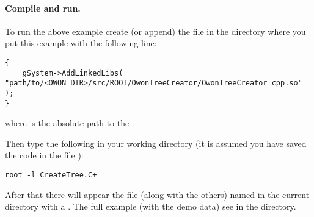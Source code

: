 \paragraph*{Compile and run.} To run the above example create (or append) the  file in the directory
where you put this example with the following line:
\begin{lstlisting}
{
    gSystem->AddLinkedLibs( "path/to/<OWON_DIR>/src/ROOT/OwonTreeCreator/OwonTreeCreator_cpp.so" );
}
\end{lstlisting}
where  is the absolute path to the .

Then type the following in your working directory (it is assumed you have saved the code in the file ):
\begin{lstlisting}
root -l CreateTree.C+
\end{lstlisting}
After that there will appear the file (along with the others) named  in the current directory with a . The full example (with the demo data)
see in the  directory.
